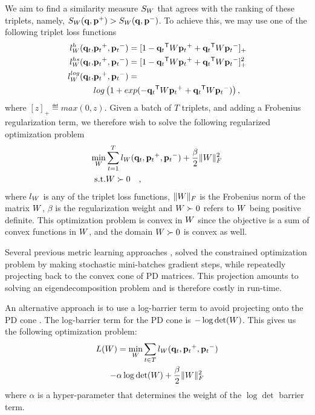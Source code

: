 \documentclass{article}
\begin{document}
We aim to find a similarity measure $S_{{W}}$ that agrees with the ranking of these triplets, namely, $S_{{W}}({\mathbf{q}}, {\mathbf{p}}^{+}) > S_{{W}}({\mathbf{q}},
{\mathbf{p}}^{-})$. To achieve this, we may use one of the following triplet loss functions
\begin{align}
\label{single-triplet-lossed}
l_{{W}}^h({{\mathbf{q}}_{{t}}}, &{{\mathbf{p}}_{{t}}}^{+}, {{\mathbf{p}}_{{t}}}^{-}) = [1-{{\mathbf{q}}_{{t}}}{}^\mathsf{T}{W}{{\mathbf{p}}_{{t}}}^+ + {{\mathbf{q}}_{{t}}}{}^\mathsf{T}{W}{{\mathbf{p}}_{{t}}}^-]_{+}
 \\ \nonumber
l_{{W}}^{hs}({{\mathbf{q}}_{{t}}}, &{{\mathbf{p}}_{{t}}}^+, {{\mathbf{p}}_{{t}}}^-) = [1-{{\mathbf{q}}_{{t}}}{}^\mathsf{T}{W}{{\mathbf{p}}_{{t}}}^+ + {{\mathbf{q}}_{{t}}}{}^\mathsf{T}{W}{{\mathbf{p}}_{{t}}}^-]_{+}^2
 \\ \nonumber
l_{{W}}^{log}({{\mathbf{q}}_{{t}}}, &{{\mathbf{p}}_{{t}}}^+, {{\mathbf{p}}_{{t}}}^-) = \\ 
&log\left(1+exp(-{{\mathbf{q}}_{{t}}}{}^\mathsf{T}{W}{{\mathbf{p}}_{{t}}}^+ + {{\mathbf{q}}_{{t}}}{}^\mathsf{T}{W}{{\mathbf{p}}_{{t}}}^-)\right) \nonumber ,
\end{align}
where $[z]_{+} \eqdef max(0,z)$.  Given a batch of $T$ triplets, and adding a Frobenius regularization term, we therefore wish to solve the following regularized optimization problem
\begin{eqnarray}
  \min_{{W}}& \sum_{{t}=1}^T  l_{{W}}({{\mathbf{q}}_{{t}}}, {{\mathbf{p}}_{{t}}}^+, {{\mathbf{p}}_{{t}}}^-) + \frac{\beta}{2} {\|{W}\|_F^2}
 \\  \nonumber
   \rm{s.t.}& {W} \succ 0 \quad,
  \label{hingelt}
\end{eqnarray}
where $l_{{W}}$ is any of the triplet loss functions, ${\|{W}\|_F}$ is the Frobenius norm of the matrix ${W}$, $\beta$ is the regularization weight and ${W} \succ 0$ refers to ${W}$ being positive definite. This optimization problem is convex in ${W}$ since the objective is a sum of convex functions in ${W}$, and the domain ${W} \succ 0$ is convex as well.

Several previous metric learning approaches \cite{qianHD, qian}, solved the constrained optimization problem by making stochastic mini-batches gradient steps, while repeatedly projecting back to the convex cone of PD matrices. This projection amounts to solving an eigendecomposition problem and is therefore costly in run-time.

An alternative approach is to use a log-barrier term to avoid projecting onto the PD cone \cite{davis2007information,lego}. The log-barrier term for the PD cone is $- \log \det ({W})$. This gives us the following optimization problem:
\begin{multline}
\label{eq-logdet-loss}
  L(W) = 
  \min_{{W}} \sum_{{t} \in T}  l_{{W}}({{\mathbf{q}}_{{t}}}, {{\mathbf{p}}_{{t}}}^+, {{\mathbf{p}}_{{t}}}^-) \\ 
  - \alpha \log \det({W}) + \frac{\beta}{2} {\|{W}\|_F^2}
\end{multline}
where $\alpha$ is a hyper-parameter that determines the weight of the
$\log \det$ barrier term.
\end{document}
